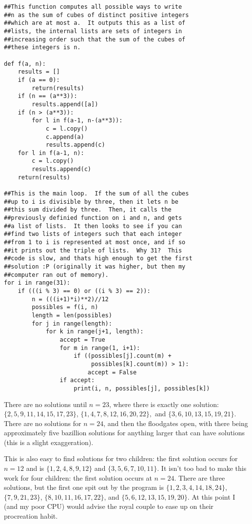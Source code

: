 \documentclass[11pt]{article}
\theoremstyle{definition}
\begin{document}
\begin{verbatim}
##This function computes all possible ways to write
##n as the sum of cubes of distinct positive integers
##which are at most a.  It outputs this as a list of
##lists, the internal lists are sets of integers in
##increasing order such that the sum of the cubes of
##these integers is n.

def f(a, n):
    results = []
    if (a == 0):
        return(results)
    if (n == (a**3)):
        results.append([a])
    if (n > (a**3)):
        for l in f(a-1, n-(a**3)):
            c = l.copy()
            c.append(a)
            results.append(c)
    for l in f(a-1, n):
        c = l.copy()
        results.append(c)
    return(results)
    
##This is the main loop.  If the sum of all the cubes
##up to i is divisible by three, then it lets n be
##this sum divided by three.  Then, it calls the
##previously definied function on i and n, and gets
##a list of lists.  It then looks to see if you can
##find two lists of integers such that each integer
##from 1 to i is represented at most once, and if so
##it prints out the triple of lists.  Why 31?  This
##code is slow, and thats high enough to get the first
##solution :P (originally it was higher, but then my
##computer ran out of memory).
for i in range(31):
    if (((i % 3) == 0) or ((i % 3) == 2)):
        n = (((i+1)*i)**2)//12
        possibles = f(i, n)
        length = len(possibles)
        for j in range(length):
            for k in range(j+1, length):
                accept = True
                for m in range(1, i+1):
                    if ((possibles[j].count(m) +
                         possibles[k].count(m)) > 1):
                        accept = False
                if accept:
                    print(i, n, possibles[j], possibles[k])

\end{verbatim}
There are no solutions until $n = 23$, where there is exactly one solution: $\{2, 5, 9, 11, 14, 15, 17, 23\}$, $\{1, 4, 7, 8, 12, 16, 20, 22\},$ and $\{3, 6, 10, 13, 15, 19, 21\}$.  There are no solutions for $n = 24$, and then the floodgates open, with there being approximately five bazillion solutions for anything larger that can have solutions (this is a slight exaggeration).

This is also easy to find solutions for two children: the first solution occurs for $n = 12$ and is $\{1, 2, 4, 8, 9, 12\}$ and $\{3, 5, 6, 7, 10, 11\}$.  It isn't too bad to make this work for four children: the first solution occurs at $n = 24$.  There are three solutions, but the first one spit out by the program is $\{1, 2, 3, 4, 14, 18, 24\}$, $\{7, 9, 21, 23 \}$, $\{8, 10, 11, 16, 17, 22 \}$, and $\{5, 6, 12, 13, 15, 19, 20\}$.  At this point I (and my poor CPU) would advise the royal couple to ease up on their procreation habit.
\end{document}
